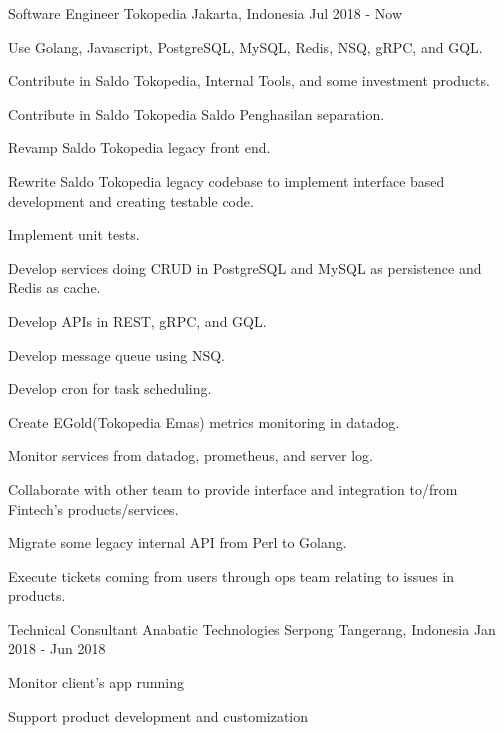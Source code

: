 \begin{cventries}

\cventry
    {Software Engineer}
    {Tokopedia}
    {Jakarta, Indonesia}
    {Jul 2018 - Now}
    {
        \begin{cvitems}
            \item {Use Golang, Javascript, PostgreSQL, MySQL, Redis, NSQ, gRPC, and GQL.}
            \item {Contribute in Saldo Tokopedia, Internal Tools, and some investment products.}
            \item {Contribute in Saldo Tokopedia Saldo Penghasilan separation.}
            \item {Revamp Saldo Tokopedia legacy front end.}
            \item {Rewrite Saldo Tokopedia legacy codebase to implement interface based development and creating testable code.}
            \item {Implement unit tests.}
            \item {Develop services doing CRUD in PostgreSQL and MySQL as persistence and Redis as cache.}
            \item {Develop APIs in REST, gRPC, and GQL.}
            \item {Develop message queue using NSQ.}
            \item {Develop cron for task scheduling.}
            \item {Create EGold(Tokopedia Emas) metrics monitoring in datadog.}
            \item {Monitor services from datadog, prometheus, and server log.}
            \item {Collaborate with other team to provide interface and integration to/from Fintech’s products/services.}
            \item {Migrate some legacy internal API from Perl to Golang.}
            \item {Execute tickets coming from users through ops team relating to issues in products.}
        \end{cvitems}
    }

\cventry
    {Technical Consultant}
    {Anabatic Technologies}
    {Serpong Tangerang, Indonesia}
    {Jan 2018 - Jun 2018}
    {
        \begin{cvitems}
            \item {Monitor client's app running}
            \item {Support product development and customization}
        \end{cvitems}
    }


\end{cventries}
